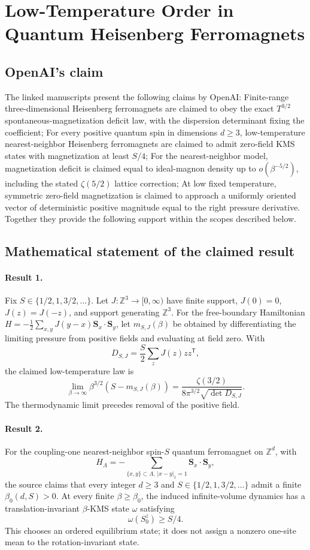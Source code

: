\documentclass[11pt]{article}
\begin{document}
\section*{Low-Temperature Order in Quantum Heisenberg Ferromagnets}

\subsection{OpenAI's claim}
The linked manuscripts present the following claims by OpenAI: Finite-range three-dimensional Heisenberg ferromagnets are claimed to obey the exact $T^{3/2}$ spontaneous-magnetization deficit law, with the dispersion determinant fixing the coefficient; For every positive quantum spin in dimensions $d\geq3$, low-temperature nearest-neighbor Heisenberg ferromagnets are claimed to admit zero-field KMS states with magnetization at least $S/4$; For the nearest-neighbor model, magnetization deficit is claimed equal to ideal-magnon density up to $o(\beta^{-5/2})$, including the stated $\zeta(5/2)$ lattice correction; At low fixed temperature, symmetric zero-field magnetization is claimed to approach a uniformly oriented vector of deterministic positive magnitude equal to the right pressure derivative. Together they provide the following support within the scopes described below.

\subsection{Mathematical statement of the claimed result}
\paragraph{Result 1.} Fix \(S\in\{1/2,1,3/2,\ldots\}\). Let \(J:\mathbb Z^3\to[0,\infty)\) have finite support, \(J(0)=0\), \(J(z)=J(-z)\), and support generating \(\mathbb Z^3\). For the free-boundary Hamiltonian \(H=-\tfrac12\sum_{x,y}J(y-x)\boldsymbol S_x\cdot\boldsymbol S_y\), let \(m_{S,J}(\beta)\) be obtained by differentiating the limiting pressure from positive fields and evaluating at field zero. With
\[
 D_{S,J}=\frac S2\sum_zJ(z)zz^{\mathsf T},
\]
the claimed low-temperature law is
\[
 \lim_{\beta\to\infty}\beta^{3/2}(S-m_{S,J}(\beta))
 =\frac{\zeta(3/2)}{8\pi^{3/2}\sqrt{\det D_{S,J}}}.
\]
The thermodynamic limit precedes removal of the positive field.

\paragraph{Result 2.} For the coupling-one nearest-neighbor spin-\(S\) quantum ferromagnet on \(\mathbb Z^d\), with
\[
 H_\Lambda=-\sum_{\{x,y\}\subset\Lambda,\ |x-y|_1=1}\boldsymbol S_x\cdot\boldsymbol S_y,
\]
the source claims that every integer \(d\ge3\) and \(S\in\{1/2,1,3/2,\ldots\}\) admit a finite \(\beta_0(d,S)>0\). At every finite \(\beta\ge\beta_0\), the induced infinite-volume dynamics has a translation-invariant \(\beta\)-KMS state \(\omega\) satisfying
\[
 \omega(S_0^z)\ge S/4.
\]
This chooses an ordered equilibrium state; it does not assign a nonzero one-site mean to the rotation-invariant state.
\end{document}
